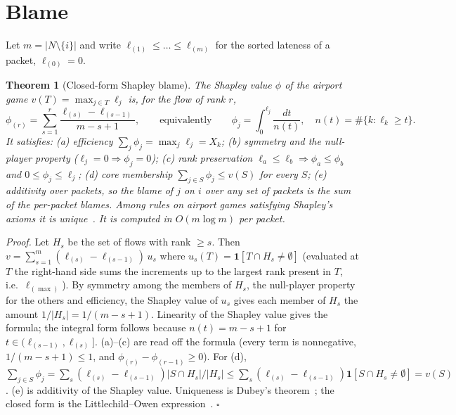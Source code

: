 \documentclass[11pt]{article}
\newtheorem{theorem}{Theorem}
\theoremstyle{definition}
\begin{document}
\section{Blame}
Let $m=|N\setminus\{i\}|$ and write $\ell_{(1)}\le\dots\le\ell_{(m)}$ for the sorted lateness of a packet, $\ell_{(0)}=0$.
\begin{theorem}[Closed-form Shapley blame]\label{thm:shapley}
The Shapley value $\phi$ of the airport game $v(T)=\max_{j\in T}\ell_j$ is, for the flow of rank $r$,
\[
\phi_{(r)}=\sum_{s=1}^{r}\frac{\ell_{(s)}-\ell_{(s-1)}}{m-s+1},\qquad\text{equivalently}\qquad \phi_j=\int_0^{\ell_j}\frac{dt}{n(t)},\quad n(t)=\#\{k:\ell_k\ge t\}.
\]
It satisfies: (a) efficiency $\sum_j\phi_j=\max_j\ell_j=X_k$; (b) symmetry and the null-player property ($\ell_j=0\Rightarrow\phi_j=0$); (c) rank preservation $\ell_a\le\ell_b\Rightarrow\phi_a\le\phi_b$ and $0\le\phi_j\le\ell_j$; (d) core membership $\sum_{j\in S}\phi_j\le v(S)$ for every $S$; (e) additivity over packets, so the blame of $j$ on $i$ over any set of packets is the sum of the per-packet blames. Among rules on airport games satisfying Shapley's axioms it is unique~\cite{dubey1982airport}. It is computed in $O(m\log m)$ per packet.
\end{theorem}
\emph{Proof.} Let $H_s$ be the set of flows with rank $\ge s$. Then $v=\sum_{s=1}^m(\ell_{(s)}-\ell_{(s-1)})\,u_s$ where $u_s(T)=\mathbf 1[T\cap H_s\ne\emptyset]$ (evaluated at $T$ the right-hand side sums the increments up to the largest rank present in $T$, i.e.\ $\ell_{(\max)}$). By symmetry among the members of $H_s$, the null-player property for the others and efficiency, the Shapley value of $u_s$ gives each member of $H_s$ the amount $1/|H_s|=1/(m-s+1)$. Linearity of the Shapley value gives the formula; the integral form follows because $n(t)=m-s+1$ for $t\in(\ell_{(s-1)},\ell_{(s)}]$. (a)--(c) are read off the formula (every term is nonnegative, $1/(m-s+1)\le1$, and $\phi_{(r)}-\phi_{(r-1)}\ge0$). For (d), $\sum_{j\in S}\phi_j=\sum_s(\ell_{(s)}-\ell_{(s-1)})|S\cap H_s|/|H_s|\le\sum_s(\ell_{(s)}-\ell_{(s-1)})\mathbf 1[S\cap H_s\ne\emptyset]=v(S)$. (e) is additivity of the Shapley value. Uniqueness is Dubey's theorem~\cite{dubey1982airport}; the closed form is the Littlechild--Owen expression~\cite{littlechild1973airport}. \hfill$\square$
\end{document}
